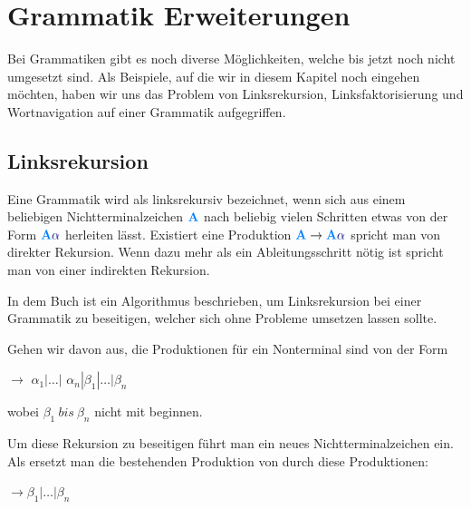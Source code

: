 \section{Grammatik Erweiterungen}


Bei Grammatiken gibt es noch diverse Möglichkeiten, welche bis jetzt noch nicht
umgesetzt sind. Als Beispiele, auf die wir in diesem Kapitel noch eingehen
möchten, haben wir uns das Problem von Linksrekursion, Linksfaktorisierung und
Wortnavigation auf einer Grammatik aufgegriffen.\vspace{10pt}

\subsection{Linksrekursion}

Eine Grammatik wird als linksrekursiv bezeichnet, wenn sich aus einem beliebigen
Nichtterminalzeichen $\NonterminalSymbol{A}$ nach beliebig vielen Schritten etwas
von der Form $\NonterminalSymbol{A} \TerminalSymbol{$\alpha$}$ herleiten lässt.
Existiert eine Produktion $\NonterminalSymbol{A} \to \NonterminalSymbol{A}
\TerminalSymbol{$\alpha$}$ spricht man von direkter Rekursion. Wenn dazu mehr als
ein Ableitungsschritt nötig ist spricht man von einer indirekten
Rekursion.\vspace{10pt}

In dem Buch \cite{Compilers} ist ein Algorithmus beschrieben, um Linksrekursion
bei einer Grammatik zu beseitigen, welcher sich ohne Probleme umsetzen lassen
sollte.\vspace{10pt}

\noindent Gehen wir davon aus, die Produktionen für ein Nonterminal
 sind von der Form\vspace{10pt}

 $\to$ $\alpha_1|\ldots|$
$\alpha_n | \beta_1 | \ldots | \beta_n$\vspace{10pt}

\noindent wobei $\beta_1\ bis\ \beta_n$ nicht mit 
beginnen.\vspace{10pt}

\noindent Um diese Rekursion zu beseitigen führt man ein neues
Nichtterminalzeichen  ein. Als ersetzt man die bestehenden Produktion von
 durch diese Produktionen:\vspace{10pt}

 $\to \beta_1 | \ldots | \beta_n$

